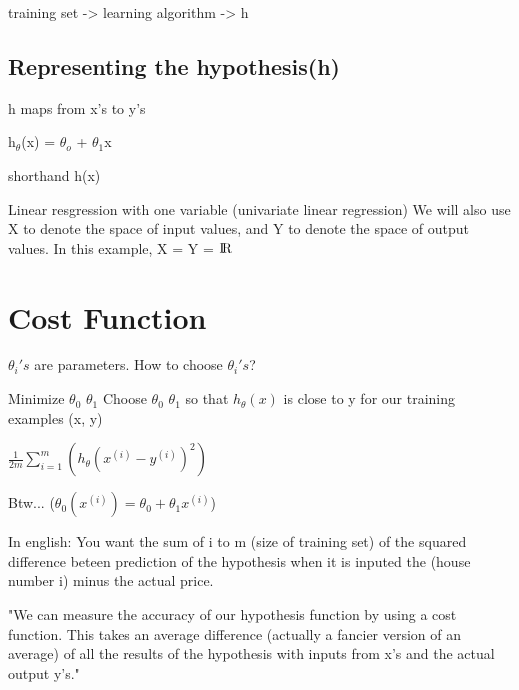 \documentclass{article}
\begin{document}
    training set -> learning algorithm -> h
    \subsection{Representing the hypothesis(h)}
    h maps from x's to y's

    h$_\theta$(x) = $\theta_o$ + $\theta_1$x

    shorthand h(x)

    Linear resgression with one variable (univariate linear regression)
    We will also use X to denote the space of input values, and Y to denote the
    space of output values. In this example, X = Y = ${\rm I\!R}$\\

    \section{Cost Function}
    $\theta_i's$ are parameters.
    How to choose $\theta_i's$?


    Minimize $\theta_0$ $\theta_1$
    Choose $\theta_0$ $\theta_1$ so that $h_\theta(x)$ is close to y for our
    training examples (x, y)


    $\frac{1}{2m}\sum_{i=1}^{m}(h_\theta(x^(i) - y^(i))^2)$

    Btw...  ($\theta_0(x^(i)) = \theta_0 + \theta_1x^(i)$)


    In english:
    You want the sum of i to m (size of training set) of the squared
    difference beteen prediction of the hypothesis when it is inputed the
    (house number i) minus the actual price.


    "We can measure the accuracy of our hypothesis function by using a cost
    function. This takes an average difference (actually a fancier version of
    an average) of all the results of the hypothesis with inputs from x's and
    the actual output y's."
\end{document}
